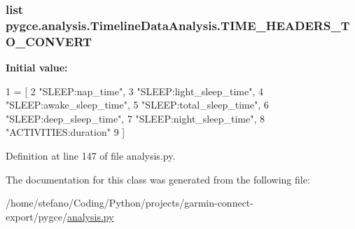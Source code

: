 \subsubsection[{\texorpdfstring{T\+I\+M\+E\+\_\+\+H\+E\+A\+D\+E\+R\+S\+\_\+\+T\+O\+\_\+\+C\+O\+N\+V\+E\+RT}{TIME_HEADERS_TO_CONVERT}}]{\setlength{\rightskip}{0pt plus 5cm}list pygce.\+analysis.\+Timeline\+Data\+Analysis.\+T\+I\+M\+E\+\_\+\+H\+E\+A\+D\+E\+R\+S\+\_\+\+T\+O\+\_\+\+C\+O\+N\+V\+E\+RT\hspace{0.3cm}{\ttfamily [static]}}\hypertarget{classpygce_1_1analysis_1_1_timeline_data_analysis_a7e17c22c5a50f78e38fccf29174441f0}{}\label{classpygce_1_1analysis_1_1_timeline_data_analysis_a7e17c22c5a50f78e38fccf29174441f0}
{\bfseries Initial value\+:}
\begin{DoxyCode}
1 = [
2         \textcolor{stringliteral}{"SLEEP:nap\_time"},
3         \textcolor{stringliteral}{"SLEEP:light\_sleep\_time"},
4         \textcolor{stringliteral}{"SLEEP:awake\_sleep\_time"},
5         \textcolor{stringliteral}{"SLEEP:total\_sleep\_time"},
6         \textcolor{stringliteral}{"SLEEP:deep\_sleep\_time"},
7         \textcolor{stringliteral}{"SLEEP:night\_sleep\_time"},
8         \textcolor{stringliteral}{"ACTIVITIES:duration"}
9     ]
\end{DoxyCode}


Definition at line 147 of file analysis.\+py.



The documentation for this class was generated from the following file\+:\begin{DoxyCompactItemize}
\item 
/home/stefano/\+Coding/\+Python/projects/garmin-\/connect-\/export/pygce/\hyperlink{analysis_8py}{analysis.\+py}\end{DoxyCompactItemize}
